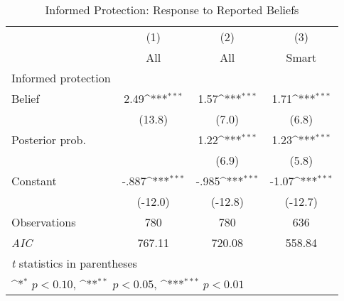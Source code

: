 \begin{table}[htbp]\centering
\def\sym#1{\ifmmode^{#1}\else\(^{#1}\)\fi}
\caption{Informed Protection: Response to Reported Beliefs}
\begin{tabular}{l*{3}{c}}
\hline\hline
                &\multicolumn{1}{c}{(1)}&\multicolumn{1}{c}{(2)}&\multicolumn{1}{c}{(3)}\\
                &\multicolumn{1}{c}{All}&\multicolumn{1}{c}{All}&\multicolumn{1}{c}{Smart}\\
\hline
Informed protection&                  &                  &                  \\
Belief          &     2.49\sym{***}&     1.57\sym{***}&     1.71\sym{***}\\
                &   (13.8)         &    (7.0)         &    (6.8)         \\
Posterior prob. &                  &     1.22\sym{***}&     1.23\sym{***}\\
                &                  &    (6.9)         &    (5.8)         \\
Constant        &    -.887\sym{***}&    -.985\sym{***}&    -1.07\sym{***}\\
                &  (-12.0)         &  (-12.8)         &  (-12.7)         \\
\hline
Observations    &      780         &      780         &      636         \\
\textit{AIC}    &   767.11         &   720.08         &   558.84         \\
\hline\hline
\multicolumn{4}{l}{\footnotesize \textit{t} statistics in parentheses}\\
\multicolumn{4}{l}{\footnotesize \sym{*} \(p<0.10\), \sym{**} \(p<0.05\), \sym{***} \(p<0.01\)}\\
\end{tabular}
\end{table}

